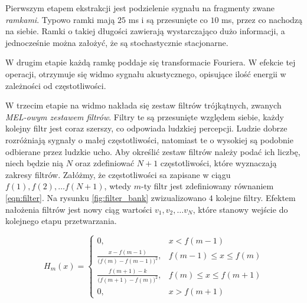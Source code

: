 \documentclass[shortabstract, mgr]{iithesis}
\begin{document}
	 Pierwszym etapem ekstrakcji jest podzielenie sygnału na fragmenty zwane \textit{ramkami}. Typowo ramki mają $25$ ms i są przesunięte co $10$ ms, przez co nachodzą na siebie. Ramki o takiej długości zawierają wystarczająco dużo informacji, a jednocześnie można założyć, że są stochastycznie stacjonarne. 
	 
	 W drugim etapie każdą ramkę poddaje się transformacie Fouriera. W efekcie tej operacji, otrzymuje się widmo sygnału akustycznego, opisujące ilość energii w zależności od częstotliwości.
	 
	 W trzecim etapie na widmo nakłada się zestaw filtrów trójkątnych, zwanych \textit{MEL-owym zestawem filtrów}. Filtry te są przesunięte względem siebie, każdy kolejny filtr jest coraz szerszy, co odpowiada ludzkiej percepcji. Ludzie dobrze rozróżniają sygnały o małej częstotliwości, natomiast te o wysokiej są podobnie odbierane przez ludzkie ucho. Aby określić zestaw filtrów należy podać ich liczbę, niech będzie nią $N$ oraz zdefiniować $N+1$ częstotliwości, które wyznaczają zakresy filtrów. Załóżmy, że częstotliwości sa zapisane w ciągu $f(1), f(2), \ldots f(N+1)$, wtedy $m$-ty filtr jest zdefiniowany równaniem \ref{eqn:filter}. Na rysunku \ref{fig:filter_bank} zwizualizowano $4$ kolejne filtry. Efektem nałożenia filtrów jest nowy ciąg wartości $v_1, v_2, \ldots v_N$, które stanowy wejście do kolejnego etapu przetwarzania.
	 
	 \begin{equation}
		 H_m(x)= 
			 \begin{cases}
				 0,				 					 & x < f(m-1) 		       \\
				 \frac{x - f(m-1)}{\big(f(m) - f(m-1)\big)^2}, & f(m-1) \leq x \leq f(m) \\
				 \frac{f(m+1) - k}{\big(f(m+1) - f(m)\big)^2}, & f(m) \leq x \leq f(m+1) \\
				 0,				 					 & x > f(m+1)
			 \end{cases}
		 \label{eqn:filter}
	 \end{equation}
	 
\end{document}
